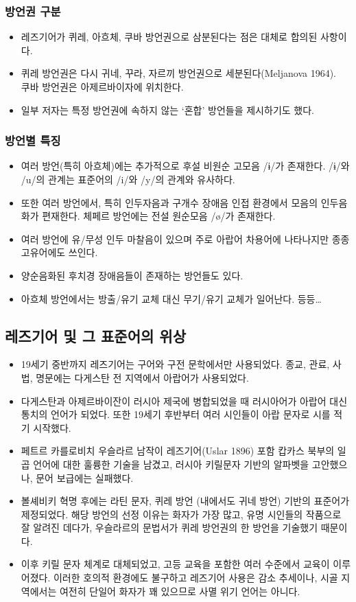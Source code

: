 \subsubsection{방언권 구분}
\begin{itemize}
	\item 레즈기어가 퀴레, 아흐체, 쿠바 방언권으로 삼분된다는 점은 대체로 합의된 사항이다.
	\item 퀴레 방언권은 다시 귀네, 꾸라, 자르끼 방언권으로 세분된다(Meljanova 1964).\\쿠바 방언권은 아제르바이자에 위치한다.
	\item 일부 저자는 특정 방언권에 속하지 않는 ‘혼합’ 방언들을 제시하기도 했다.
\end{itemize}
\subsubsection{방언별 특징}
\begin{itemize}
	\item 여러 방언(특히 아흐체)에는 추가적으로 후설 비원순 고모음 /ɨ/가 존재한다. /ɨ/와 /u/의 관계는 표준어의 /i/와 /y/의 관계와 유사하다.
	\item 또한 여러 방언에서, 특히 인두자음과 구개수 장애음 인접 환경에서 모음의 인두음화가 편재한다. 체페르 방언에는 전설 원순모음 /ø/가 존재한다.
	\item 여러 방언에 유/무성 인두 마찰음이 있으며 주로 아랍어 차용어에 나타나지만 종종 고유어에도 쓰인다.
	\item 양순음화된 후치경 장애음들이 존재하는 방언들도 있다.
	\item 아흐체 방언에서는 방출/유기 교체 대신 무기/유기 교체가 일어난다. 등등…
\end{itemize}
\subsection{레즈기어 및 그 표준어의 위상}
\begin{itemize}
	\item 19세기 중반까지 레즈기어는 구어와 구전 문학에서만 사용되었다. 종교, 관료, 사법, 명문에는 다게스탄 전 지역에서 아랍어가 사용되었다.
	\item 다게스탄과 아제르바이잔이 러시아 제국에 병합되었을 때 러시아어가 아랍어 대신 통치의 언어가 되었다. 또한 19세기 후반부터 여러 시인들이 아랍 문자로 시를 적기 시작했다.
	\item 페트르 카를로비치 우슬라르 남작이 레즈기어(Uslar 1896) 포함 캅카스 북부의 일곱 언어에 대한 훌륭한 기술을 남겼고, 러시아 키릴문자 기반의 알파벳을 고안했으나, 문어 보급에는 실패했다.
	\item 볼셰비키 혁명 후에는 라틴 문자, 퀴레 방언 (내에서도 귀네 방언) 기반의 표준어가 제정되었다. 해당 방언의 선정 이유는 화자가 가장 많고, 유명 시인들의 작품으로 잘 알려진 데다가, 우슬라르의 문법서가 퀴레 방언권의 한 방언을 기술했기 때문이다.
	\item 이후 키릴 문자 체계로 대체되었고, 고등 교육을 포함한 여러 수준에서 교육이 이루어졌다. 이러한 호의적 환경에도 불구하고 레즈기어 사용은 감소 추세이나, 시골 지역에서는 여전히 단일어 화자가 꽤 있으므로 사멸 위기 언어는 아니다.
\end{itemize}
